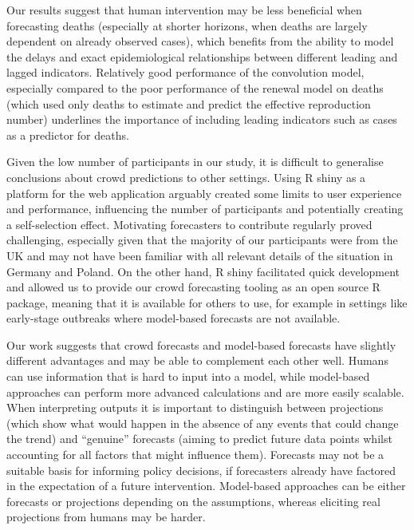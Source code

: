 \documentclass[
]{article}
\begin{document}
Our results suggest that human intervention may be less beneficial when forecasting deaths (especially at shorter horizons, when deaths are largely dependent on already observed cases), which benefits from the ability to model the delays and exact epidemiological relationships between different leading and lagged indicators. Relatively good performance of the convolution model, especially compared to the poor performance of the renewal model on deaths (which used only deaths to estimate and predict the effective reproduction number) underlines the importance of including leading indicators such as cases as a predictor for deaths.

Given the low number of participants in our study, it is difficult to generalise conclusions about crowd predictions to other settings. Using R shiny as a platform for the web application arguably created some limits to user experience and performance, influencing the number of participants and potentially creating a self-selection effect. Motivating forecasters to contribute regularly proved challenging, especially given that the majority of our participants were from the UK and may not have been familiar with all relevant details of the situation in Germany and Poland. On the other hand, R shiny facilitated quick development and allowed us to provide our crowd forecasting tooling as an open source R package, meaning that it is available for others to use, for example in settings like early-stage outbreaks where model-based forecasts are not available.

Our work suggests that crowd forecasts and model-based forecasts have slightly different advantages and may be able to complement each other well. Humans can use information that is hard to input into a model, while model-based approaches can perform more advanced calculations and are more easily scalable. When interpreting outputs it is important to distinguish between projections (which show what would happen in the absence of any events that could change the trend) and ``genuine'' forecasts (aiming to predict future data points whilst accounting for all factors that might influence them). Forecasts may not be a suitable basis for informing policy decisions, if forecasters already have factored in the expectation of a future intervention. Model-based approaches can be either forecasts or projections depending on the assumptions, whereas eliciting real projections from humans may be harder.
\end{document}
